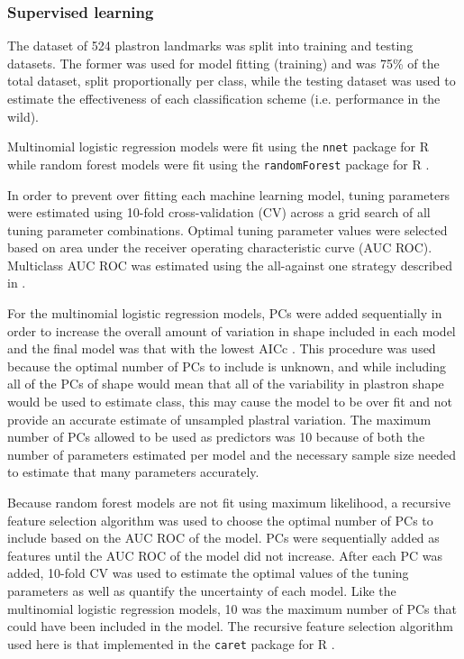 \documentclass[12pt]{article}\usepackage{graphicx, color}
\begin{document}
\subsubsection{Supervised learning}
The dataset of 524 plastron landmarks was split into training and testing datasets. The former was used for model fitting (training) and was 75\% of the total dataset, split proportionally per class, while the testing dataset was used to estimate the effectiveness of each classification scheme (i.e. performance in the wild).

Multinomial logistic regression models were fit using the \texttt{nnet} package for R \citep{Venables2002} while random forest models were fit using the \texttt{randomForest} package for R \citep{Liaw2002}.


In order to prevent over fitting each machine learning model, tuning parameters were estimated using 10-fold cross-validation (CV) across a grid search of all tuning parameter combinations. Optimal tuning parameter values were selected based on area under the receiver operating characteristic curve (AUC ROC). Multiclass AUC ROC was estimated using the all-against one strategy described in \citet{Hand2001}.

For the multinomial logistic regression models, PCs were added sequentially in order to increase the overall amount of variation in shape included in each model and the final model was that with the lowest AICc \cite{Burnham2002a}. This procedure was used because the optimal number of PCs to include is unknown, and while including all of the PCs of shape would mean that all of the variability in plastron shape would be used to estimate class, this may cause the model to be over fit and not provide an accurate estimate of unsampled plastral variation. The maximum number of PCs allowed to be used as predictors was 10 because of both the number of parameters estimated per model and the necessary sample size needed to estimate that many parameters accurately. 

Because random forest models are not fit using maximum likelihood, a recursive feature selection algorithm was used to choose the optimal number of PCs to include based on the AUC ROC of the model. PCs were sequentially added as features until the AUC ROC of the model did not increase. After each PC was added, 10-fold CV was used to estimate the optimal values of the tuning parameters as well as quantify the uncertainty of each model. Like the multinomial logistic regression models, 10 was the maximum number of PCs that could have been included in the model. The recursive feature selection algorithm used here is that implemented in the \texttt{caret} package for R \citep{Kuhn2013}.
\end{document}
